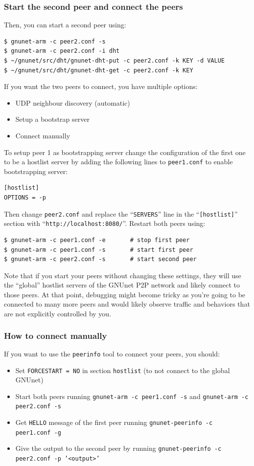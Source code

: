 \documentclass[10pt]{article}
\begin{document}
\subsubsection{Start the second peer and connect the peers}
Then, you can start a second peer using:
\lstset{language=bash}
\begin{lstlisting}
$ gnunet-arm -c peer2.conf -s
$ gnunet-arm -c peer2.conf -i dht
$ ~/gnunet/src/dht/gnunet-dht-put -c peer2.conf -k KEY -d VALUE
$ ~/gnunet/src/dht/gnunet-dht-get -c peer2.conf -k KEY
\end{lstlisting}
If you want the two peers to connect, you have multiple options:
\begin{itemize}
\itemsep0em
  \item UDP neighbour discovery (automatic)
  \item Setup a bootstrap server
  \item Connect manually
\end{itemize}
To setup peer 1 as bootstrapping server change the configuration of
the first one to be a hostlist server by adding the following lines to
\texttt{peer1.conf} to enable bootstrapping server:
 \begin{lstlisting}
[hostlist]
OPTIONS = -p
\end{lstlisting}

Then change {\tt peer2.conf} and replace the ``\texttt{SERVERS}'' line in the ``\texttt{[hostlist]}'' section with
``\texttt{http://localhost:8080/}''.  Restart both peers using:
\begin{lstlisting}
$ gnunet-arm -c peer1.conf -e		# stop first peer
$ gnunet-arm -c peer1.conf -s		# start first peer
$ gnunet-arm -c peer2.conf -s		# start second peer
\end{lstlisting}

Note that if you start your peers without changing these settings, they
will use the ``global'' hostlist servers of the GNUnet P2P network and
likely connect to those peers.  At that point, debugging might become
tricky as you're going to be connected to many more peers and would
likely observe traffic and behaviors that are not explicitly controlled
by you.

\subsubsection{How to connect manually}
If you want to use the \texttt{peerinfo} tool to connect your peers, you should:
\begin{itemize}
\itemsep0em
 \item{Set {\tt FORCESTART = NO} in section {\tt hostlist} (to not connect to the global GNUnet)}
 \item{Start both peers running {\tt gnunet-arm -c peer1.conf -s} and {\tt gnunet-arm -c peer2.conf -s}}
 \item{Get \texttt{HELLO} message of the first peer running {\tt gnunet-peerinfo -c peer1.conf -g}}
 \item{Give the output to the second peer by running {\tt gnunet-peerinfo -c peer2.conf -p '<output>'}}
\end{itemize}
\end{document}
